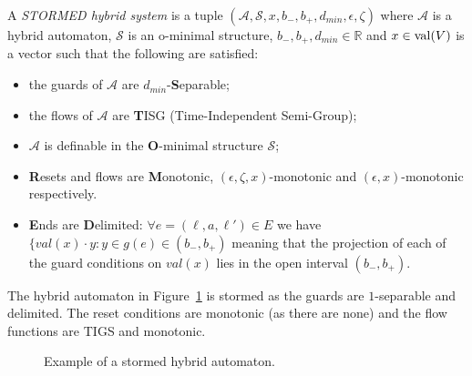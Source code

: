 \begin{defi}
A \emph{STORMED hybrid system} is a tuple $(\mathcal{A},\mathcal{S},x,b_{-},b_{+},d_{min},\epsilon,\zeta)$ where $\mathcal{A}$ is a hybrid automaton, $\mathcal{S}$ is an o-minimal structure, $b_{-},b_{+},d_{min}\in\mathbb{R}$ and $x\in \operatorname{val}(V)$ is a vector such that the following are satisfied:
\begin{itemize}
    \item the guards of $\mathcal{A}$ are $d_{min}$-\textbf{S}eparable;
    \item the flows of $\mathcal{A}$ are \textbf{T}ISG (Time-Independent Semi-Group);
    \item $\mathcal{A}$ is definable in the \textbf{O}-minimal structure $\mathcal{S}$;
    \item \textbf{R}esets and flows are \textbf{M}onotonic, $(\epsilon,\zeta,x)$-monotonic and $(\epsilon,x)$-monotonic respectively.
    \item \textbf{E}nds are \textbf{D}elimited: $\forall e=(\ell,a,\ell')\in E$ we have
    $\{val(x)\cdot y : y\in g(e)\in(b_{-},b_{+})$ meaning that the projection of each of the guard conditions on $val(x)$ lies in the open interval $(b_{-},b_{+})$.
\end{itemize}
\end{defi}

\begin{ex}
The hybrid automaton in Figure~\ref{fig:exstormed} is stormed as the guards are $1$-separable and delimited. The reset conditions are monotonic (as there are none) and the flow functions are TIGS and monotonic.
\begin{figure}[H]
    \begin{center}
        \caption{Example of a stormed hybrid automaton.}
        \label{fig:exstormed}
    \end{center}
\end{figure}
\end{ex}
